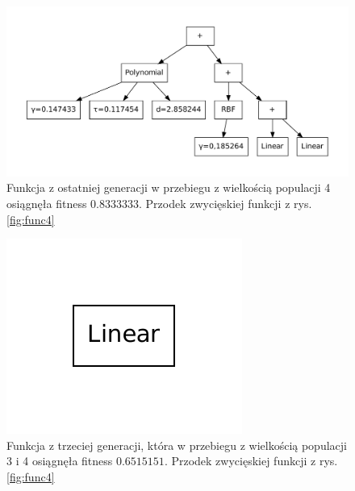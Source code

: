    	\begin{figure}
		\includegraphics[scale=0.60]{figures/functions/func5}
		\caption{Funkcja z ostatniej generacji w przebiegu z wielkością populacji 4 osiągnęła fitness $0.8333333$. Przodek zwycięskiej funkcji z rys.\ref{fig:func4} \label{fig:func5}}
	\end{figure}          


   	\begin{figure}
		\includegraphics[scale=0.60]{figures/functions/func3}
		\caption{Funkcja z trzeciej generacji, która w przebiegu z wielkością populacji 3 i 4 osiągnęła fitness $0.6515151$. Przodek zwycięskiej funkcji z rys.\ref{fig:func4}\label{fig:func3}}
	\end{figure}                 

